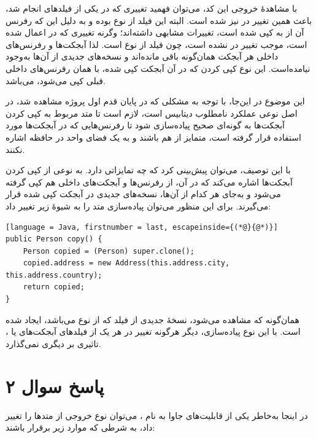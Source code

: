 \documentclass{article}
\begin{document}
با مشاهدۀ خروجی این کد، می‌توان فهمید تغییری که در یکی از فیلدهای  انجام شد، باعث همین تغییر در  نیز شده است. البته این فیلد از نوع  بوده و به دلیل این که رفرنس آن از  به  کپی شده است، تغییرات مشابهی داشته‌اند؛ وگرنه تغییری که در  اعمال شده است، موجب تغییر در  نشده است، چون فیلد  از نوع  است. لذا آبجکت‌ها و رفرنس‌های داخلی هر آبجکت همان‌گونه باقی مانده‌اند و نسخه‌های جدیدی از آن‌ها به‌وجود نیامده‌است. این نوع کپی کردن که در آن آبجکت کپی شده، با همان رفرنس‌های داخلی قبلی کپی می‌شود،  می‌باشد.

این موضوع در این‌جا، با توجه به مشکلی که در پایان قدم اول پروژه مشاهده شد، در اصل نوعی عملکرد نامطلوب دیتابیس است، لازم است تا متد مربوط به کپی کردن آبجکت‌ها به گونه‌ای صحیح پیاده‌سازی شود تا رفرنس‌هایی که در آبجکت‌ها مورد استفاده قرار گرفته است، متمایز از هم باشند و به یک فضای واحد در حافظه اشاره نکنند.

با این توصیف، می‌توان پیش‌بینی کرد که  چه تمایزاتی دارد.  به نوعی از کپی کردن آبجکت‌ها اشاره می‌کند که در آن، از رفرنس‌ها و آبجکت‌های داخلی هم کپی گرفته می‌شود و به‌جای هر کدام از آن‌ها، نسخه‌های جدیدی در آبجکت کپی شده قرار می‌گیرند. برای این منظور می‌توان پیاده‌سازی متد  را به شیوۀ زیر تغییر داد:

\begin{latin}
\begin{lstlisting}[language = Java, firstnumber = last, escapeinside={(*@}{@*)}]
public Person copy() {
    Person copied = (Person) super.clone();
    copied.address = new Address(this.address.city, this.address.country);
    return copied;
}
\end{lstlisting}
\end{latin}

همان‌گونه که مشاهده می‌شود، نسخۀ جدیدی از فیلد  که از نوع  می‌باشد، ایجاد شده است. با این نوع پیاده‌سازی، دیگر هرگونه تغییر در هر یک از فیلدهای آبجکت‌های  یا ، تاثیری بر دیگری نمی‌گذارد.

\section*{پاسخ سوال ۲}

در اینجا به‌خاطر یکی از قابلیت‌های جاوا به نام ، می‌توان نوع خروجی از متد‌ها را تغییر داد، به شرطی که موارد زیر برقرار باشند:
\end{document}
